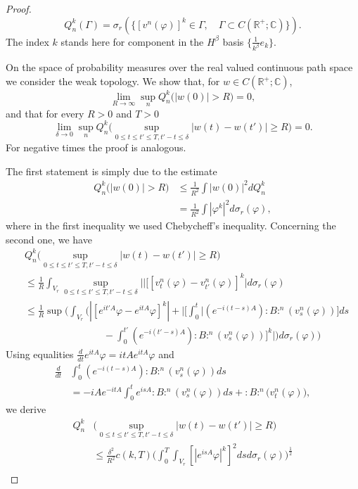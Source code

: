 \documentclass[11pt,leqno]{amsart}
\begin{document}
\begin{proof}
$$Q_n^k (\Gamma ) =\sigma_r(\{ [v^n (\varphi )]^k \in \Gamma, \quad \Gamma \subset C(\mathbb R^+ ; \mathbb C ) \} ).$$
The index $k$ stands here for  component in the $H^\beta$ basis  $\{ \frac{1}{k^\beta} e_k \} $.

On the space of probability measures over the real valued continuous path space we consider the weak topology. We show that, for $w\in C(\mathbb R^+ ; \mathbb C )$,
$$\lim_{R\rightarrow \infty} \sup_n Q_n^k \Big( |w(0)| >R \Big) =0,$$
and that for every $R>0$ and $T>0$
$$\lim_{\delta \rightarrow 0}\sup_n Q_n^k \Big( \sup_{0\leq t\leq t' \leq T , t'-t\leq \delta} |w(t) -w(t' )|\geq R \Big)=0 .$$ 
For negative times the proof is analogous.


The first statement is simply due to the estimate
\begin{align*}
Q_n^k \Big( |w(0)| >R \Big)& \leq  \frac{1}{R^2 } \int |w(0) |^2 dQ_n^k\\
&=\frac{1}{R^2 } \int |\varphi^k |^2 d\sigma_r(\varphi), 
\end{align*}
 where in the first inequality  we used Chebycheff's inequality. Concerning the second one, we have 
\begin{align*}
&Q_n^k \Big( \sup_{0\leq t\leq t' \leq T, t'-t\leq \delta}|w(t) -w(t' )|\geq R \Big)  \\
&\leq \frac{1}{R} \int_{V_r}  \sup_{0\leq t\leq t' \leq T, t'-t\leq \delta}| | [[v_t^n (\varphi )-v_{t'}^n (\varphi ) ]^k | d\sigma_r(\varphi)\\
&\leq \frac{1}{R}  \sup \Big(\int_{V_r}  \Big( |[e^{it' A} \varphi -e^{itA}\varphi ]^k | 
+ \Big|\Big[ \int_0^t |( e^{-i (t -s)A} ) :B:^n (v_s^n (\varphi ))]  ds \\ 
&\qquad \qquad \qquad \qquad -\int_0^{t'} ( e^{-i (t' -s)A} ) :B:^n (v_s^n (\varphi ))\Big]^k \Big| \Big) d\sigma_r(\varphi) \Big)
\end{align*}
Using equalities
$\frac{d}{dt} e^{itA}\varphi = itA e^{itA}\varphi$ and 
\begin{align*}
\frac{d}{dt}&  \int_0^t ( e^{-i (t -s)A} ) :B:^n (v_s^n (\varphi ))  ds \\
&=-iAe^{-itA} \int_0^t e^{isA} :B:^n (v_s^n (\varphi ))  ds +{ :B:^n (v_t^n (\varphi )} ),
\end{align*} 
we derive
\begin{align*}
Q_n^k &\Big( \sup_{0\leq t\leq t' \leq T, t'-t\leq \delta}|w(t) -w(t' )|\geq R \Big) \\
&\leq \frac{\delta^2}{R^2} c(k,T) \Big( \int_0^T{ \int_{V_r} } [ |e^{isA}\varphi |^k ]^2 dsd\sigma_r (\varphi )\Big)^{\frac{1}{2}}\\

\end{align*}
\end{proof}
\end{document}
